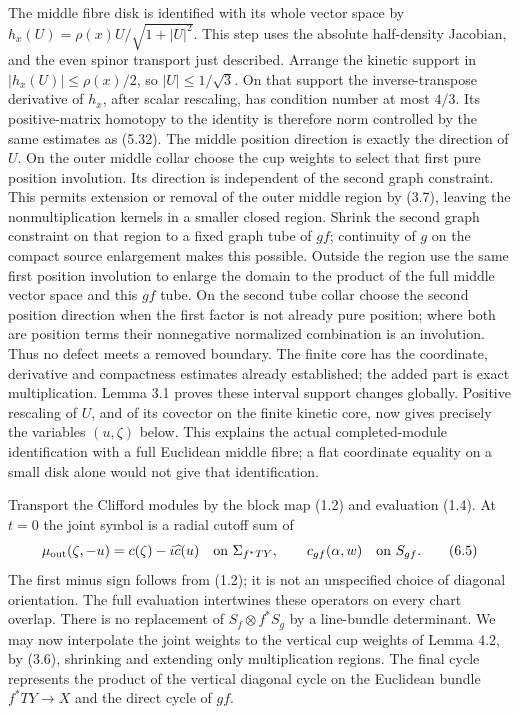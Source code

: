 \documentclass[
  11pt,
]{article}
\begin{document}
The middle fibre disk is identified with its whole vector space by
\(h_x(U)=\rho(x)U/\sqrt{1+|U|^2}\). This step uses the absolute
half-density Jacobian, and the even spinor transport just described.
Arrange the kinetic support in \(|h_x(U)|\leq\rho(x)/2\), so
\(|U|\leq1/\sqrt3\). On that support the inverse-transpose derivative of
\(h_x\), after scalar rescaling, has condition number at most \(4/3\).
Its positive-matrix homotopy to the identity is therefore norm
controlled by the same estimates as (5.32). The middle position
direction is exactly the direction of \(U\). On the outer middle collar
choose the cup weights to select that first pure position involution.
Its direction is independent of the second graph constraint. This
permits extension or removal of the outer middle region by (3.7),
leaving the nonmultiplication kernels in a smaller closed region. Shrink
the second graph constraint on that region to a fixed graph tube of
\(gf\); continuity of \(g\) on the compact source enlargement makes this
possible. Outside the region use the same first position involution to
enlarge the domain to the product of the full middle vector space and
this \(gf\) tube. On the second tube collar choose the second position
direction when the first factor is not already pure position; where both
are position terms their nonnegative normalized combination is an
involution. Thus no defect meets a removed boundary. The finite core has
the coordinate, derivative and compactness estimates already
established; the added part is exact multiplication. Lemma 3.1 proves
these interval support changes globally. Positive rescaling of \(U\),
and of its covector on the finite kinetic core, now gives precisely the
variables \((u,\zeta)\) below. This explains the actual completed-module
identification with a full Euclidean middle fibre; a flat coordinate
equality on a small disk alone would not give that identification.

Transport the Clifford modules by the block map (1.2) and evaluation
(1.4). At \(t=0\) the joint symbol is a radial cutoff sum of \[
 \mu_{\rm out}(\zeta,-u)=c(\zeta)-i\widehat c(u)
 \quad\hbox{on }\Sigma_{f^*TY},
 \qquad
 c_{gf}(\alpha,w)\quad\hbox{on }S_{gf}.
 \tag{6.5}
\] The first minus sign follows from (1.2); it is not an unspecified
choice of diagonal orientation. The full evaluation intertwines these
operators on every chart overlap. There is no replacement of
\(S_f\otimes f^*S_g\) by a line-bundle determinant. We may now
interpolate the joint weights to the vertical cup weights of Lemma 4.2,
by (3.6), shrinking and extending only multiplication regions. The final
cycle represents the product of the vertical diagonal cycle on the
Euclidean bundle \(f^*TY\to X\) and the direct cycle of \(gf\).
\end{document}
